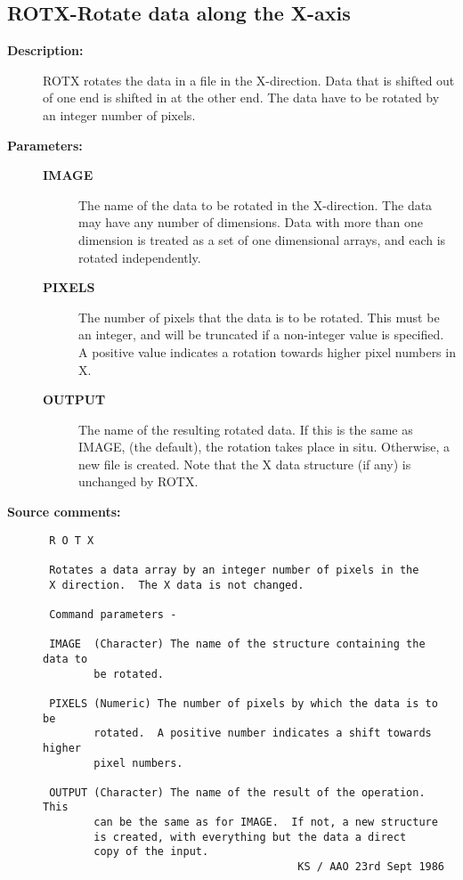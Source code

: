 \subsection{ROTX-\label{ROTX}Rotate data along the X-axis}
\begin{description}

\item [{\bf Description:}]
 ROTX rotates the data in a file in the X-direction.  Data that
 is shifted out of one end is shifted in at the other end.  The
 data have to be rotated by an integer number of pixels.

\item [{\bf Parameters:}]
\begin{description}
\item [{\bf IMAGE}]
 The name of the data to be rotated in
 the X-direction.  The data may have any number of
 dimensions.  Data with more than one dimension is treated
 as a set of one dimensional arrays, and each is rotated
 independently.
\item [{\bf PIXELS}]
 The number of pixels that the data is to
 be rotated.  This must be an integer, and will be truncated
 if a non-integer value is specified.  A positive value
 indicates a rotation towards higher pixel numbers in X.
\item [{\bf OUTPUT}]
 The name of the resulting rotated data.
 If this is the same as IMAGE, (the default), the rotation
 takes place in situ.  Otherwise, a new file is created.
 Note that the X data structure (if any) is unchanged by
 ROTX.
\end{description}

\item [{\bf Source comments:}]
\begin{verbatim}
 R O T X

 Rotates a data array by an integer number of pixels in the
 X direction.  The X data is not changed.

 Command parameters -

 IMAGE  (Character) The name of the structure containing the data to
        be rotated.

 PIXELS (Numeric) The number of pixels by which the data is to be
        rotated.  A positive number indicates a shift towards higher
        pixel numbers.

 OUTPUT (Character) The name of the result of the operation.  This
        can be the same as for IMAGE.  If not, a new structure
        is created, with everything but the data a direct
        copy of the input.
                                        KS / AAO 23rd Sept 1986
\end{verbatim}
\end{description}
